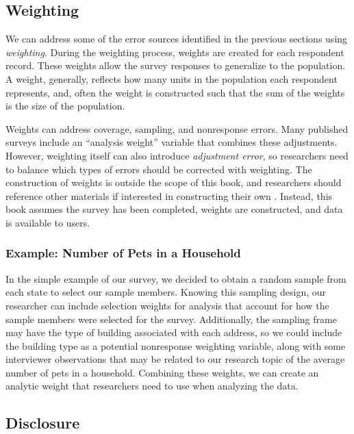 \documentclass[
]{krantz}
\begin{document}
\hypertarget{overview-post-weighting}{%
\subsection{Weighting}\label{overview-post-weighting}}

We can address some of the error sources identified in the previous sections using \emph{weighting}. During the weighting process, weights are created for each respondent record. These weights allow the survey responses to generalize to the population. A weight, generally, reflects how many units in the population each respondent represents, and, often the weight is constructed such that the sum of the weights is the size of the population.

Weights can address coverage, sampling, and nonresponse errors. Many published surveys include an ``analysis weight'' variable that combines these adjustments. However, weighting itself can also introduce \emph{adjustment error}, so researchers need to balance which types of errors should be corrected with weighting. The construction of weights is outside the scope of this book, and researchers should reference other materials if interested in constructing their own \citep{Valliant2018weights}. Instead, this book assumes the survey has been completed, weights are constructed, and data is available to users.

\hypertarget{overview-post-weighting-ex}{%
\subsubsection*{Example: Number of Pets in a Household}\label{overview-post-weighting-ex}}


In the simple example of our survey, we decided to obtain a random sample from each state to select our sample members. Knowing this sampling design, our researcher can include selection weights for analysis that account for how the sample members were selected for the survey. Additionally, the sampling frame may have the type of building associated with each address, so we could include the building type as a potential nonresponse weighting variable, along with some interviewer observations that may be related to our research topic of the average number of pets in a household. Combining these weights, we can create an analytic weight that researchers need to use when analyzing the data.

\hypertarget{overview-post-disclosure}{%
\subsection{Disclosure}\label{overview-post-disclosure}}
\end{document}
